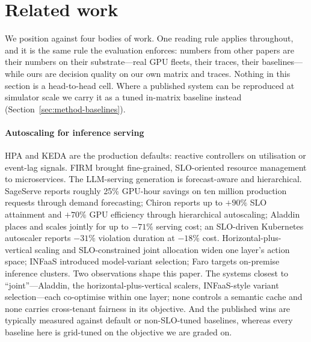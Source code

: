 \section{Related work}
\label{sec:related}

We position \polyforge{} against four bodies of work. One reading rule
applies throughout, and it is the same rule the evaluation enforces:
numbers from other papers are their numbers on their substrate---real GPU
fleets, their traces, their baselines---while ours are decision quality on
our own matrix and traces. Nothing in this section is a head-to-head cell.
Where a published system can be reproduced at simulator scale we carry it
as a tuned in-matrix baseline instead (Section~\ref{sec:method-baselines}).

\paragraph{Autoscaling for inference serving}
HPA \citep{k8shpa} and KEDA \citep{keda} are the production defaults:
reactive controllers on utilisation or event-lag signals. FIRM
\citep{firm2020} brought fine-grained, SLO-oriented resource management to
microservices. The LLM-serving generation is forecast-aware and
hierarchical. SageServe \citep{sageserve2025} reports roughly 25\% GPU-hour
savings on ten million production requests through demand forecasting;
Chiron \citep{chiron2025} reports up to $+90\%$ SLO attainment and $+70\%$
GPU efficiency through hierarchical autoscaling; Aladdin
\citep{aladdin2024} places and scales jointly for up to $-71\%$ serving
cost; an SLO-driven Kubernetes autoscaler \citep{k8sslo2025} reports
$-31\%$ violation duration at $-18\%$ cost. Horizontal-plus-vertical
scaling \citep{taleoftwoscales2024} and SLO-constrained joint allocation
\citep{jointalloc2026} widen one layer's action space; INFaaS
\citep{infaas2019} introduced model-variant selection; Faro
\citep{faro2024} targets on-premise inference clusters. Two observations
shape this paper. The systems closest to ``joint''---Aladdin, the
horizontal-plus-vertical scalers, INFaaS-style variant selection---each
co-optimise within one layer; none controls a semantic cache and none
carries cross-tenant fairness in its objective. And the published wins are
typically measured against default or non-SLO-tuned baselines, whereas
every baseline here is grid-tuned on the objective we are graded on.

